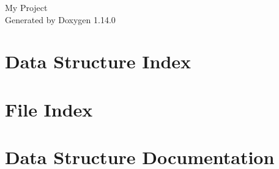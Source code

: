\documentclass[twoside]{book}
\newcommand{\+}{\discretionary{\mbox{\scriptsize$\hookleftarrow$}}{}{}}
\newcommand{\clearemptydoublepage}{%
    \newpage{\pagestyle{empty}\cleardoublepage}%
  }
\begin{document}
  \raggedbottom
    \hypersetup{pageanchor=false,
                bookmarksnumbered=true,
                pdfencoding=unicode
               }
  \begin{titlepage}
  \vspace*{7cm}
  \begin{center}%
  {\Large My Project}\\
  \vspace*{1cm}
  {\large Generated by Doxygen 1.14.0}\\
  \end{center}
  \end{titlepage}
  \clearemptydoublepage
  \tableofcontents
  \clearemptydoublepage
  \hypersetup{pageanchor=true}
\chapter{Data Structure Index}

\chapter{File Index}

\chapter{Data Structure Documentation}




























\end{document}
